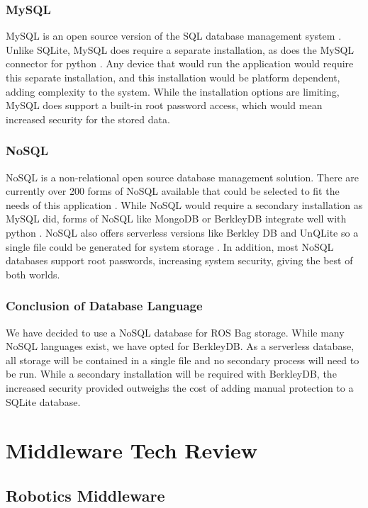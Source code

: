 \documentclass[onecolumn, draftclsnofoot,10pt, compsoc]{report}
\begin{document}
\subsection{MySQL}
MySQL is an open source version of the SQL database management system \cite{WhatIsMySQL}. Unlike SQLite, MySQL does require a separate installation, as does the MySQL connector for python \cite{MySQLForPython}. Any device that would run the application would require this separate installation, and this installation would be platform dependent, adding complexity to the system. While the installation options are limiting, MySQL does support a built-in root password access, which would mean increased security for the stored data.
\subsection{NoSQL}
NoSQL is a non-relational open source database management solution. There are currently over 200 forms of NoSQL available that could be selected to fit the needs of this application \cite{WhatisNoSQL}. While NoSQL would require a secondary installation as MySQL did, forms of NoSQL like MongoDB or BerkleyDB integrate well with python \cite{MongoDB, BerkleyDB}. NoSQL also offers serverless versions like Berkley DB and UnQLite so a single file could be generated for system storage \cite{BerkleyDB, UnQLite}. In addition, most NoSQL databases support root passwords, increasing system security, giving the best of both worlds.
\subsection{Conclusion of Database Language}
We have decided to use a NoSQL database for ROS Bag storage. While many NoSQL languages exist, we have opted for BerkleyDB. As a serverless database, all storage will be contained in a single file and no secondary process will need to be run. While a secondary installation will be required with BerkleyDB, the increased security provided outweighs the cost of adding manual protection to a SQLite database.  


\chapter{Middleware Tech Review}
\minitoc
\section{Robotics Middleware}
\end{document}
